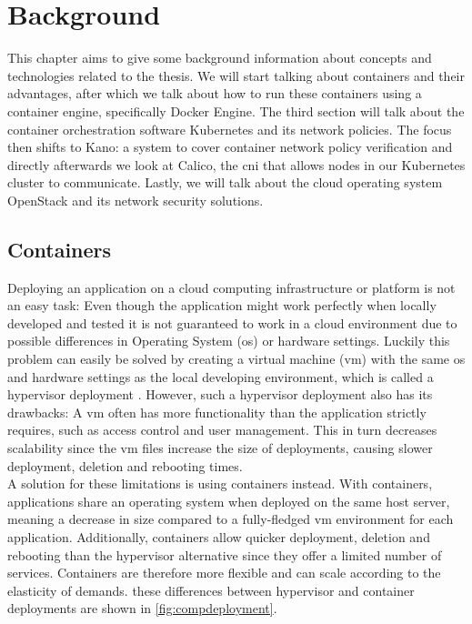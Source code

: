 \chapter{Background}                                 \label{ch:background}
This chapter aims to give some background information about concepts and technologies related to the thesis.
We will start talking about containers and their advantages, after which we talk about how to run these containers using a container engine, specifically Docker Engine. The third section will talk about the container orchestration software Kubernetes and its network policies. The focus then shifts to Kano: a system to cover container network policy verification and directly afterwards we look at Calico, the \acrlong{cni} that allows nodes in our Kubernetes cluster to communicate. Lastly, we will talk about the cloud operating system OpenStack and its network security solutions.


\section{Containers}
Deploying an application on a cloud computing infrastructure or platform is not an easy task: Even though the application might work perfectly when locally developed and tested it is not guaranteed to work in a cloud environment due to possible differences in Operating System (\acrshort{os}) or hardware settings. Luckily this problem can easily be solved by creating a virtual machine (\acrshort{vm}) with the same \acrshort{os} and hardware settings as the local developing environment, which is called a hypervisor deployment \cite{Bernstein2014}. However, such a hypervisor deployment also has its drawbacks: A \acrshort{vm} often has more functionality than the application strictly requires, such as access control and user management. This in turn decreases scalability since the \acrshort{vm} files increase the size of deployments, causing slower deployment, deletion and rebooting times.
\\[10pt]

A solution for these limitations is using containers instead. With containers, applications share an operating system when deployed on the same host server, meaning a decrease in size compared to a fully-fledged \acrshort{vm} environment for each application. Additionally, containers allow quicker deployment, deletion and rebooting than the hypervisor alternative since they offer a limited number of services. Containers are therefore more flexible and can scale according to the elasticity of demands.  these differences between hypervisor and container deployments are shown in \autoref{fig:compdeployment}. 
\\[10pt]


